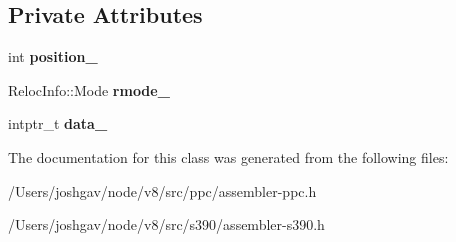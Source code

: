 \subsection*{Private Attributes}
\begin{DoxyCompactItemize}
\item 
int {\bfseries position\+\_\+}\hypertarget{classv8_1_1internal_1_1_deferred_reloc_info_a05e70414d2d0947e3273e69d94a065cf}{}\label{classv8_1_1internal_1_1_deferred_reloc_info_a05e70414d2d0947e3273e69d94a065cf}

\item 
Reloc\+Info\+::\+Mode {\bfseries rmode\+\_\+}\hypertarget{classv8_1_1internal_1_1_deferred_reloc_info_a97c10f660e1e44fe1a851e0673a6c9ca}{}\label{classv8_1_1internal_1_1_deferred_reloc_info_a97c10f660e1e44fe1a851e0673a6c9ca}

\item 
intptr\+\_\+t {\bfseries data\+\_\+}\hypertarget{classv8_1_1internal_1_1_deferred_reloc_info_a56280e477d3a5f0dea202c4b4549459a}{}\label{classv8_1_1internal_1_1_deferred_reloc_info_a56280e477d3a5f0dea202c4b4549459a}

\end{DoxyCompactItemize}


The documentation for this class was generated from the following files\+:\begin{DoxyCompactItemize}
\item 
/\+Users/joshgav/node/v8/src/ppc/assembler-\/ppc.\+h\item 
/\+Users/joshgav/node/v8/src/s390/assembler-\/s390.\+h\end{DoxyCompactItemize}
